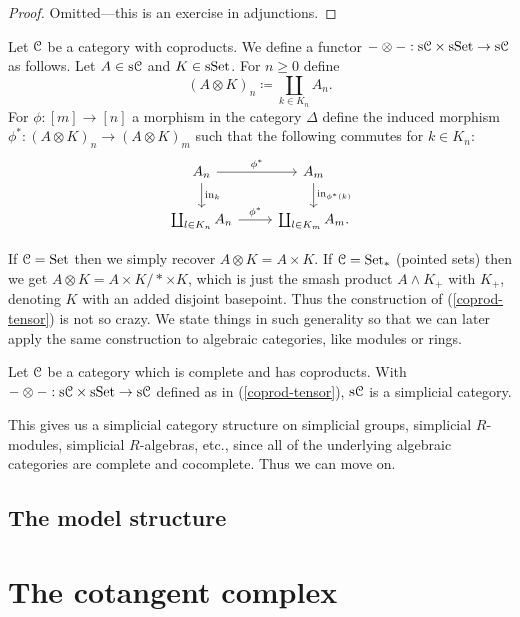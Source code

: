\begin{proof}
  Omitted---this is an exercise in adjunctions.
\end{proof}

\begin{construction}
  \label{coprod-tensor}
  Let $\mathcal{C}$ be a category with coproducts. We define a functor $-
  \otimes - : \mathrm{s}\mathcal{C} \times \mathrm{s}\mathrm{Set} \to \mathrm{s}\mathcal{C}$ as follows. Let $A \in
  \mathrm{s}\mathcal{C}$ and $K \in \mathrm{s}\mathrm{Set}$. For $n \ge 0$ define
  \[
  (A \otimes K)_n \coloneqq \coprod_{k \in K_n} A_n.
  \]
  For $\phi : [m] \to [n]$ a morphism in the category $\Delta$ define
  the induced morphism $\phi^* : (A \otimes K)_n \to (A \otimes K)_m$
  such that the following commutes for $k \in K_n$:
  \[
  \begin{tikzcd}
    A_n \rar{\phi^*} \dar{\incl_k} & A_m \dar{\incl_{\phi^*(k)}}
    \\ \coprod_{l \in K_n} A_n \rar{\phi^*} &\coprod_{l \in K_m} A_m.
  \end{tikzcd}
  \]
\end{construction}

\begin{examples}
  If $\mathcal{C} = \mathrm{Set}$ then we simply recover $A \otimes K = A \times K$. If
  $\mathcal{C} = \mathrm{Set}_*$ (pointed sets) then we get $A \otimes K = A \times K /
  * \times K$, which is just the smash product $A \wedge K_+$ with
  $K_+$, denoting $K$ with an added disjoint basepoint. Thus the
  construction of (\ref{coprod-tensor}) is not so crazy. We state
  things in such generality so that we can later apply the same
  construction to algebraic categories, like modules or rings.
\end{examples}

\begin{proposition}
  \label{coprod-simplcat}
  Let $\mathcal{C}$ be a category which is complete and has coproducts. With $-
  \otimes - : \mathrm{s}\mathcal{C} \times \mathrm{s}\mathrm{Set} \to \mathrm{s}\mathcal{C}$ defined as in
  (\ref{coprod-tensor}), $\mathrm{s}\mathcal{C}$ is a simplicial category.
\end{proposition}

This gives us a simplicial category structure on simplicial groups,
simplicial $R$-modules, simplicial $R$-algebras, etc., since all of
the underlying algebraic categories are complete and cocomplete. Thus
we can move on.


\subsection*{The model structure}




\section{The cotangent complex}






